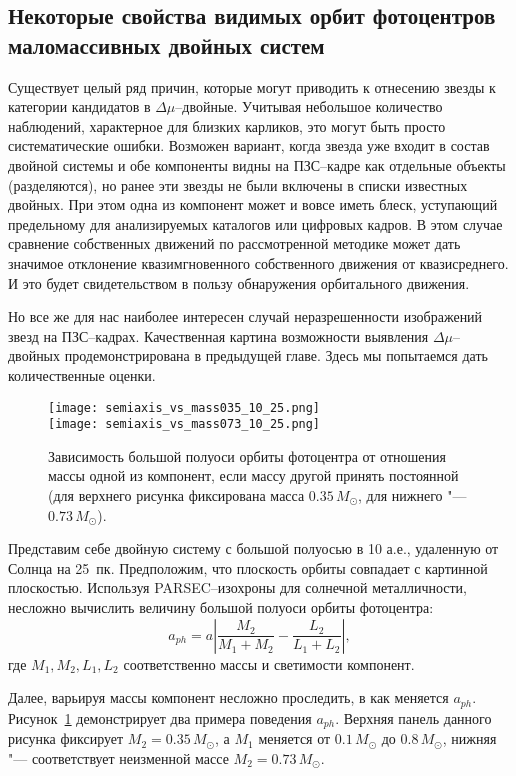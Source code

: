\subsection{Некоторые свойства видимых орбит фотоцентров маломассивных двойных систем}\label{subsec:ch1/sect2/sub1}
Существует целый ряд причин, которые могут приводить к отнесению звезды к категории кандидатов в $\Delta\mu$--двойные. Учитывая небольшое количество наблюдений, характерное для близких карликов, это могут быть просто систематические ошибки. Возможен вариант, когда звезда уже входит в состав двойной системы и обе компоненты видны на ПЗС--кадре как отдельные объекты (разделяются), но ранее эти звезды не были включены в списки известных двойных. При этом одна из компонент может и вовсе иметь блеск, уступающий предельному для  анализируемых каталогов или цифровых кадров. В этом случае сравнение собственных движений по рассмотренной методике может дать значимое отклонение квазимгновенного  собственного движения от квазисреднего. И это будет свидетельством в пользу обнаружения орбитального движения.

Но все же для нас наиболее интересен случай неразрешенности изображений звезд на ПЗС--кадрах. Качественная картина возможности выявления $\Delta\mu$--двойных продемонстрирована в предыдущей главе. Здесь мы попытаемся дать количественные оценки.

\begin{figure}[pt]\label{fig:semiaxis1}
\centering
\texttt{[image: semiaxis\_vs\_mass035\_10\_25.png]}\\
\texttt{[image: semiaxis\_vs\_mass073\_10\_25.png]}
\caption{Зависимость большой полуоси орбиты фотоцентра от отношения массы одной из компонент, если массу другой принять постоянной (для верхнего рисунка фиксирована масса $0.35\,M_\odot$, для нижнего "--- $0.73\,M_\odot$).}
\end{figure}

Представим себе двойную систему с большой полуосью в 10 а.е., удаленную от Солнца на 25~пк. Предположим, что плоскость орбиты совпадает с картинной плоскостью. Используя PARSEC--изохроны для солнечной металличности, несложно вычислить величину большой полуоси орбиты фотоцентра:
\begin{equation}
\label{eq:Photocenter}
 a_{ph}=a\left| \frac{M_2}{M_1+M_2} - \frac{L_2}{L_1+L_2} \right|,
\end{equation}
где $M_1,M_2,L_1,L_2$ соответственно массы и светимости компонент.

Далее, варьируя массы компонент несложно проследить, в как меняется $a_{ph}$. Рисунок~\ref{fig:semiaxis1} демонстрирует два примера поведения $a_{ph}$. Верхняя панель данного рисунка фиксирует $M_2 = 0.35\,M_\odot$, а $M_1$ меняется от $0.1\,M_\odot$ до $0.8\,M_\odot$, нижняя "--- соответствует неизменной массе $M_2 = 0.73\,M_\odot$.

